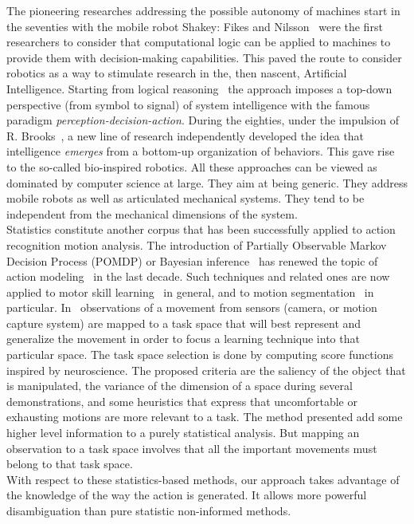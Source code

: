 \documentclass[letterpaper, 10pt, conference]{ieeeconf}      %
\begin{document}
The pioneering researches addressing the possible autonomy of machines
start in the seventies with the mobile robot Shakey: Fikes and Nilsson~\cite{fikes71}
were the first researchers to consider that computational logic can be
applied to machines to provide them with decision-making capabilities.
This paved the route to consider robotics as a way to stimulate research
in the, then nascent, Artificial Intelligence. Starting from logical
reasoning~\cite{ghallab04} the approach imposes a top-down perspective (from symbol to
signal) of system intelligence with the famous paradigm
\emph{perception-decision-action}. During the eighties, under the impulsion
of R. Brooks~\cite{brooks86}, a new line of research independently developed the idea
that intelligence \emph{emerges} from a bottom-up organization of behaviors.
This gave rise to the so-called bio-inspired robotics. All these
approaches can be viewed as dominated by computer science at large. They
aim at being generic. They address mobile robots as well as articulated
mechanical systems. They tend to be independent from the mechanical
dimensions of the system.\\

Statistics constitute another corpus that has been successfully applied
to action recognition motion analysis. The introduction of Partially
Observable Markov Decision Process (POMDP) or Bayesian inference~\cite{pearl88} has
renewed the topic of action modeling~\cite{kaelbling98} in the last decade. Such
techniques and related ones are now applied to motor skill learning~\cite{peters08} in
general, and to motion segmentation~\cite{calinon10, inamura04} in particular. 
In~\cite{muhlig09} observations of a movement from sensors (camera, or motion capture system)
are mapped to a task space that will best represent and generalize the movement in order to focus
a learning technique into that particular space. The task space selection is
done by computing score functions inspired by neuroscience. The proposed criteria are
the saliency of the object that is manipulated, the variance of the dimension
of a space during several demonstrations, and some heuristics that express that
uncomfortable or exhausting motions are more relevant to a task. The method
presented add some higher level information to a purely statistical analysis. But
mapping an observation to a task space involves that all the important movements must
belong to that task space.\\

With respect to these statistics-based methods, our approach takes advantage of the
knowledge of the way the action is generated. It allows more powerful
disambiguation than pure statistic non-informed methods.
\end{document}
